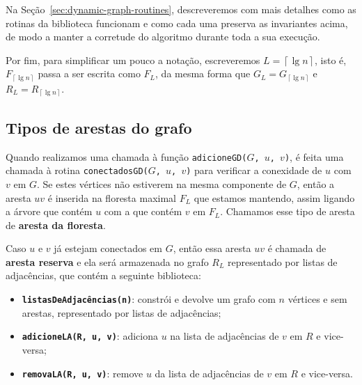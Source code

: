 Na Seção~\ref{sec:dynamic-graph-routines}, descreveremos com mais detalhes como as rotinas da biblioteca funcionam e como cada uma preserva as invariantes acima, de modo a manter a corretude do algoritmo durante toda a sua execução.

Por fim, para simplificar um pouco a notação, escreveremos $L = \left\lceil \lg n \right\rceil$, isto é, $F_{\left\lceil \lg n \right\rceil}$ passa a ser escrita como $F_{L}$, da mesma forma que $G_L = G_{\left\lceil \lg n \right\rceil}$ e $R_L = R_{\left\lceil \lg n \right\rceil}$.

\subsection{Tipos de arestas do grafo}
\label{sec:dynamic-graph-edge-types}


Quando realizamos uma chamada à função \texttt{adicioneGD($G$, $u$, $v$)}, é feita uma chamada à rotina \texttt{conectadosGD($G$, $u$, $v$)} para verificar a conexidade de $u$ com $v$ em $G$. Se estes vértices não estiverem na mesma componente de $G$, então a aresta $uv$ é inserida na floresta maximal $F_L$ que estamos mantendo, assim ligando a árvore que contém $u$ com a que contém $v$ em $F_L$. Chamamos esse tipo de aresta de \textbf{aresta da floresta}.

Caso $u$ e $v$ já estejam conectados em $G$, então essa aresta $uv$ é chamada de \textbf{aresta reserva} e ela será armazenada no grafo $R_L$ representado por listas de adjacências, que contém a seguinte biblioteca:

\begin{itemize}
    \item \texttt{\textbf{listasDeAdjacências(n)}}: constrói e devolve um grafo com $n$ vértices e sem arestas, representado por listas de adjacências;
    \item \texttt{\textbf{adicioneLA(R, u, v)}}: adiciona $u$ na lista de adjacências de $v$ em $R$ e vice-versa;
    \item \texttt{\textbf{removaLA(R, u, v)}}: remove $u$ da lista de adjacências de $v$ em $R$ e vice-versa.
\end{itemize} 

